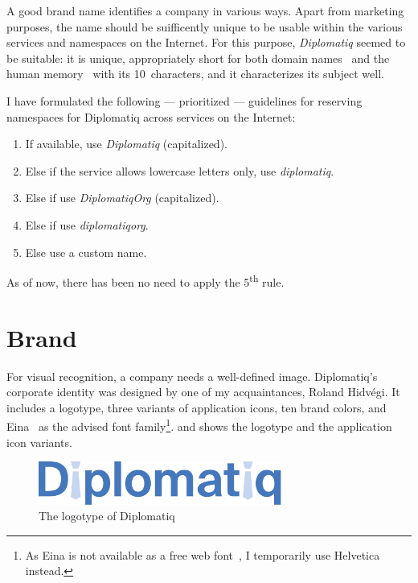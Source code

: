 A good brand name identifies a company in various ways. Apart from marketing purposes, the name should be suifficently unique to be usable within the various services and namespaces on the Internet. For this purpose, \emph{Diplomatiq} seemed to be suitable: it is unique, appropriately short for both domain names~\cite{howtochoosedomainname} and the human memory~\cite{memoryfour} with its 10~characters, and it characterizes its subject well.

I have formulated the following — prioritized — guidelines for reserving namespaces for Diplomatiq across services on the Internet:

\begin{enumerate}
\item If available, use \emph{Diplomatiq} (capitalized).
\item Else if the service allows lowercase letters only, use \emph{diplomatiq}.
\item Else if use \emph{DiplomatiqOrg} (capitalized).
\item Else if use \emph{diplomatiqorg}.
\item Else use a custom name.
\end{enumerate}

As of now, there has been no need to apply the 5\textsuperscript{th} rule.

\section{Brand}

For visual recognition, a company needs a well-defined image. Diplomatiq's corporate identity was designed by one of my acquaintances, Roland Hidvégi. It includes a logotype, three variants of application icons, ten brand colors, and Eina~\cite{eina} as the advised font family\footnote{As Eina is not available as a free web font~\cite{eina-licensing}, I temporarily use Helvetica instead.}.  and  shows the logotype and the application icon variants.

\begin{figure}[!htb]
    \centering
    \vspace{2mm}
    \includegraphics[width=8cm]{figures/diplomatiq-logo.pdf}
    \caption{The logotype of Diplomatiq}
    \label{fig:diplomatiq-logotype}
\end{figure}

